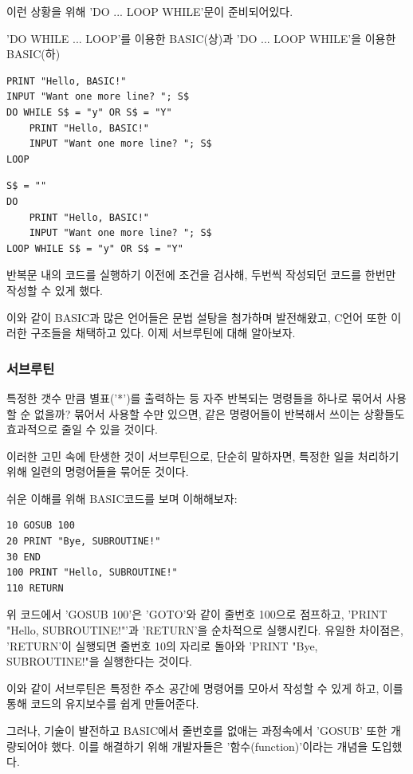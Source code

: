 \documentclass{article}
\begin{document}
이런 상황을 위해 'DO ... LOOP WHILE'문이 준비되어있다.



'DO WHILE ... LOOP'를 이용한 BASIC(상)과 'DO ... LOOP WHILE'을 이용한 BASIC(하)

\begin{lstlisting}
PRINT "Hello, BASIC!"
INPUT "Want one more line? "; S$
DO WHILE S$ = "y" OR S$ = "Y"
    PRINT "Hello, BASIC!"
    INPUT "Want one more line? "; S$
LOOP
\end{lstlisting}
\begin{lstlisting}
S$ = ""
DO
    PRINT "Hello, BASIC!"
    INPUT "Want one more line? "; S$
LOOP WHILE S$ = "y" OR S$ = "Y"
\end{lstlisting}


반복문 내의 코드를 실행하기 이전에 조건을 검사해, 두번씩 작성되던 코드를 한번만 작성할 수 있게 했다.

이와 같이 BASIC과 많은 언어들은 문법 설탕을 첨가하며 발전해왔고, C언어 또한 이러한 구조들을 채택하고 있다.
이제 서브루틴에 대해 알아보자.



\subsubsection{서브루틴}

특정한 갯수 만큼 별표('*')를 출력하는 등 자주 반복되는 명령들을 하나로 묶어서 사용할 순 없을까?
묶어서 사용할 수만 있으면, 같은 명령어들이 반복해서 쓰이는 상황들도 효과적으로 줄일 수 있을 것이다.

이러한 고민 속에 탄생한 것이 서브루틴으로,
단순히 말하자면, 특정한 일을 처리하기 위해 일련의 명령어들을 묶어둔 것이다.

쉬운 이해를 위해 BASIC코드를 보며 이해해보자:

\begin{lstlisting}
10 GOSUB 100
20 PRINT "Bye, SUBROUTINE!"
30 END
100 PRINT "Hello, SUBROUTINE!"
110 RETURN
\end{lstlisting}

위 코드에서 'GOSUB 100'은 'GOTO'와 같이 줄번호 100으로 점프하고,
'PRINT "Hello, SUBROUTINE!"'과 'RETURN'을 순차적으로 실행시킨다.
유일한 차이점은, 'RETURN'이 실행되면 줄번호 10의 자리로 돌아와
'PRINT "Bye, SUBROUTINE!"을 실행한다는 것이다.

이와 같이 서브루틴은 특정한 주소 공간에 명령어를 모아서 작성할 수 있게 하고,
이를 통해 코드의 유지보수를 쉽게 만들어준다.

그러나, 기술이 발전하고 BASIC에서 줄번호를 없애는 과정속에서 'GOSUB' 또한 개량되어야 했다.
이를 해결하기 위해 개발자들은 '함수(function)'이라는 개념을 도입했다.
\end{document}
